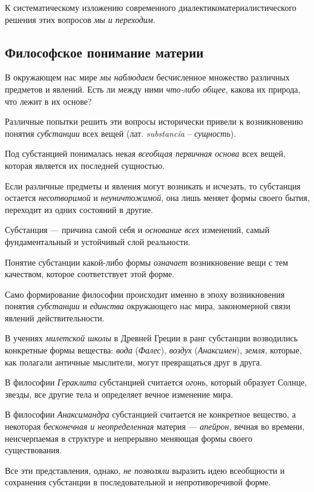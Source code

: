 \documentclass[a4paper,14pt,russian]{extreport}
\begin{document}
К систематическому изложению современного диалектикоматериалистического решения этих вопросов \emph{мы и переходим}.

\subsection{Философское понимание материи}

В окружающем нас мире \emph{мы наблюдаем} бесчисленное множество различных предметов и явлений. Есть ли между ними \emph{что-либо общее}, какова их природа, что лежит в их основе?

Различные попытки решить эти вопросы исторически привели к возникновению понятия \emph{субстанции} всех вещей (лат. \emph{substancia} -- \emph{сущность}).

Под субстанцией понималась некая \emph{всеобщая первичная основа} всех вещей, которая является их последней сущностью.

Если различные предметы и явления могут возникать и исчезать, то субстанция остается \emph{несотворимой} и \emph{неуничтожимой}, она лишь меняет формы своего бытия, переходит из одних состояний в другие.

Субстанция --- причина самой себя и \emph{основание всех} изменений, самый фундаментальный и устойчивый слой реальности.

Понятие субстанции какой-либо формы \emph{означает} возникновение вещи с тем качеством, которое соответствует этой форме.

Само формирование философии происходит именно в эпоху возникновения понятия \emph{субстанции} и \emph{единства} окружающего нас мира, закономерной связи явлений действительности.

В учениях \emph{милетской школы} в Древней Греции в ранг субстанции возводились конкретные формы вещества: \emph{вода} (\emph{Фалес}), \emph{воздух} (\emph{Анаксимен}), \emph{земля}, которые, как полагали античные мыслители, могут превращаться друг в друга.

В философии \emph{Гераклита} субстанцией считается \emph{огонь}, который образует Солнце, звезды, все другие тела и определяет вечное изменение мира.

В философии \emph{Анаксимандра} субстанцией считается не конкретное вещество, а некоторая \emph{бесконечная и неопределенная} материя --- \emph{апейрон}, вечная во времени, неисчерпаемая в структуре и непрерывно меняющая формы своего существования.

Все эти представления, однако, \emph{не позволяли} выразить идею всеобщности и сохранения субстанции в последовательной и непротиворечивой форме.
\end{document}
